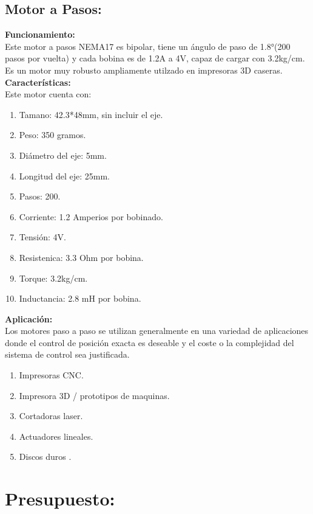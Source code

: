 \documentclass[14pt,a4paper]{article}
\begin{document}
\subsection{Motor a Pasos:}
\textbf{Funcionamiento:}\\
Este motor a pasos NEMA17 es bipolar, tiene un ángulo de paso de 1.8°(200 pasos por vuelta) y cada bobina es de 1.2A a 4V, capaz de cargar con 3.2kg/cm. Es un motor muy robusto ampliamente utilzado en impresoras 3D caseras.\\
\textbf{Características:}\\
Este motor cuenta con:\\
\begin{enumerate}
\item Tamano: 42.3*48mm, sin incluir el eje.
\item Peso: 350 gramos.
\item Diámetro del eje: 5mm.
\item Longitud del eje: 25mm.
\item Pasos: 200.
\item Corriente: 1.2 Amperios por bobinado.
\item Tensión: 4V.
\item Resistenica: 3.3 Ohm por bobina.
\item Torque: 3.2kg/cm.
\item Inductancia: 2.8 mH por bobina.
\end{enumerate}
\textbf{Aplicación:}\\
Los motores paso a paso se utilizan generalmente en una variedad de aplicaciones donde el control de posición exacta es deseable y el coste o la complejidad del sistema de control sea justificada.\\
\begin{enumerate}
\item Impresoras CNC.
\item Impresora 3D / prototipos de maquinas.
\item Cortadoras laser.
\item Actuadores lineales.
\item Discos duros .
\end{enumerate}

\section{Presupuesto:}
\end{document}
